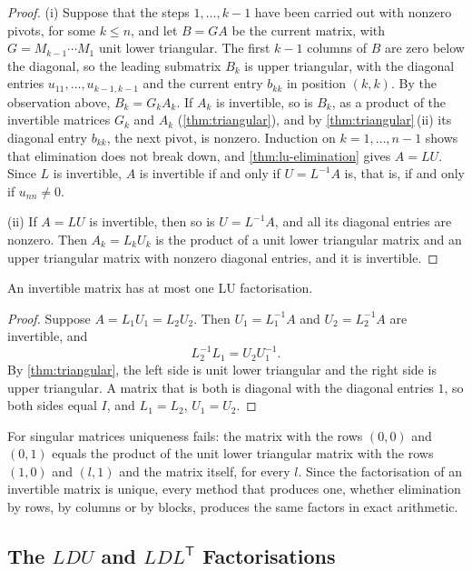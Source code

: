 \begin{proof}
(i) Suppose that the steps $1,\ldots,k-1$ have been carried out with nonzero pivots, for some $k\le n$, and let $B=GA$ be the current matrix, with $G=M_{k-1}\cdots M_1$ unit lower triangular. The first $k-1$ columns of $B$ are zero below the diagonal, so the leading submatrix $B_k$ is upper triangular, with the diagonal entries $u_{11},\ldots,u_{k-1,k-1}$ and the current entry $b_{kk}$ in position $(k,k)$. By the observation above, $B_k=G_kA_k$. If $A_k$ is invertible, so is $B_k$, as a product of the invertible matrices $G_k$ and $A_k$ (\cref{thm:triangular}), and by \cref{thm:triangular}\,(ii) its diagonal entry $b_{kk}$, the next pivot, is nonzero. Induction on $k=1,\ldots,n-1$ shows that elimination does not break down, and \cref{thm:lu-elimination} gives $A=LU$. Since $L$ is invertible, $A$ is invertible if and only if $U=L^{-1}A$ is, that is, if and only if $u_{nn}\ne0$.

(ii) If $A=LU$ is invertible, then so is $U=L^{-1}A$, and all its diagonal entries are nonzero. Then $A_k=L_kU_k$ is the product of a unit lower triangular matrix and an upper triangular matrix with nonzero diagonal entries, and it is invertible.
\end{proof}

\begin{theorem}
\label{thm:lu-unique}
An invertible matrix has at most one LU factorisation.
\end{theorem}

\begin{proof}
Suppose $A=L_1U_1=L_2U_2$. Then $U_1=L_1^{-1}A$ and $U_2=L_2^{-1}A$ are invertible, and
\[
L_2^{-1}L_1=U_2U_1^{-1}.
\]
By \cref{thm:triangular}, the left side is unit lower triangular and the right side is upper triangular. A matrix that is both is diagonal with the diagonal entries $1$, so both sides equal $I$, and $L_1=L_2$, $U_1=U_2$.
\end{proof}

For singular matrices uniqueness fails: the matrix with the rows $(0,0)$ and $(0,1)$ equals the product of the unit lower triangular matrix with the rows $(1,0)$ and $(l,1)$ and the matrix itself, for every $l$. Since the factorisation of an invertible matrix is unique, every method that produces one, whether elimination by rows, by columns or by blocks, produces the same factors in exact arithmetic.

\subsection{The \texorpdfstring{$LDU$}{LDU} and \texorpdfstring{$LDL^{\mathsf T}$}{LDLT} Factorisations}

